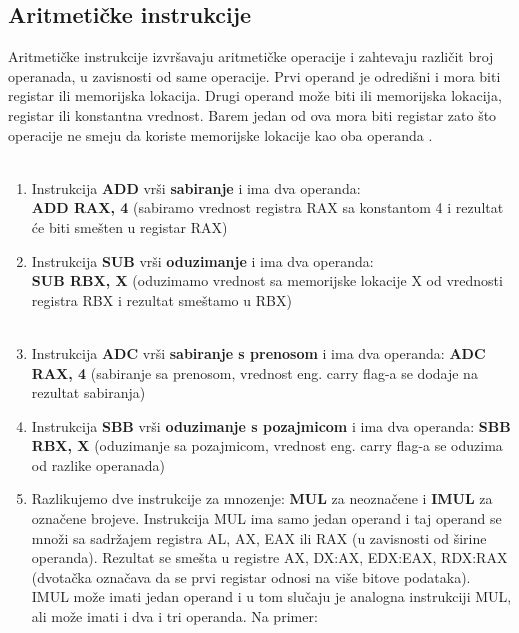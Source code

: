 \documentclass[a4paper]{article}
\begin{document}
\subsection{\textbf{Aritmeti\v cke instrukcije}} 
Aritmeti\v cke instrukcije izvr\v savaju aritmeti\v cke operacije i zahtevaju razli\v cit broj operanada,
u zavisnosti od same operacije.
Prvi operand je odredi\v sni i mora biti registar ili memorijska lokacija. Drugi operand mo\v ze biti ili
memorijska lokacija, registar ili konstantna vrednost. Barem jedan od ova mora biti registar zato \v sto 
operacije ne smeju da koriste memorijske lokacije kao oba operanda \cite{x86Assembly}. \\ \\
\begin{enumerate}
\item{Instrukcija \textbf{ADD} vr\v si \textbf{sabiranje} i ima dva operanda:} \\
\textbf{ADD RAX, 4} (sabiramo vrednost registra RAX sa konstantom 4 i rezultat \' ce biti sme\v sten u registar RAX) \\
\item{Instrukcija \textbf{SUB} vr\v si \textbf{oduzimanje} i ima dva operanda:} \\
\textbf{SUB RBX, X}  (oduzimamo vrednost sa memorijske lokacije X od vrednosti registra RBX i rezultat sme\v stamo u RBX) \\ \
\item{Instrukcija \textbf{ADC} vr\v si \textbf{sabiranje s prenosom} i ima dva operanda: }
\textbf{ADC RAX, 4}  (sabiranje sa prenosom, vrednost eng. carry flag-a se dodaje na rezultat sabiranja) \\ 
\item{Instrukcija \textbf{SBB} vr\v si \textbf{oduzimanje s pozajmicom} i ima dva operanda:}
\textbf{SBB RBX, X}  (oduzimanje sa pozajmicom, vrednost eng. carry flag-a se oduzima od razlike operanada) \\ 
\item {Razlikujemo dve instrukcije za mnozenje: \textbf{MUL} za neozna\v cene i \textbf{IMUL} za ozna\v cene brojeve. Instrukcija MUL ima samo jedan operand i taj operand se mno\v zi sa 
sadr\v zajem registra  AL, AX, EAX ili RAX (u zavisnosti od \v sirine operanda). Rezultat se sme\v sta u registre AX, DX:AX,
EDX:EAX, RDX:RAX (dvota\v cka ozna\v cava da se prvi registar odnosi na vi\v se bitove podataka). IMUL mo\v ze imati jedan 
operand i u tom slu\v caju je analogna instrukciji MUL, ali mo\v ze imati i dva i tri operanda. Na primer:} \\

\end{enumerate}
\end{document}
